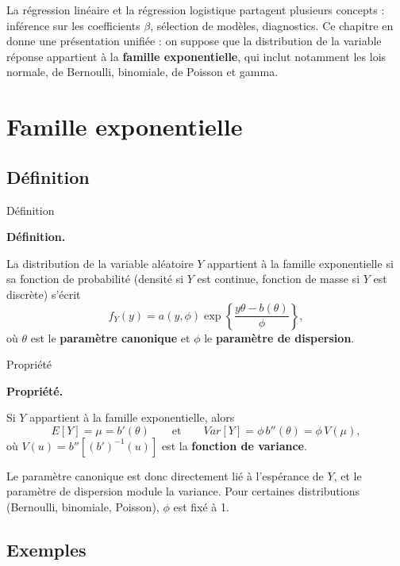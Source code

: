 \documentclass[
  french,
  letterpaper,
  DIV=11,
  numbers=noendperiod]{scrreprt}
\begin{document}
La régression linéaire et la régression logistique partagent plusieurs
concepts : inférence sur les coefficients \(\beta\), sélection de
modèles, diagnostics. Ce chapitre en donne une présentation unifiée : on
suppose que la distribution de la variable réponse appartient à la
\textbf{famille exponentielle}, qui inclut notamment les lois normale,
de Bernoulli, binomiale, de Poisson et gamma.

\section{Famille exponentielle}\label{famille-exponentielle}

\subsection{Définition}\label{duxe9finition}

{Définition}

\textbf{Définition.}

La distribution de la variable aléatoire \(Y\) appartient à la famille
exponentielle si sa fonction de probabilité (densité si \(Y\) est
continue, fonction de masse si \(Y\) est discrète) s'écrit
\[f_Y(y) = a(y,\phi)\exp\left\{\frac{y\theta - b(\theta)}{\phi}\right\},\]
où \(\theta\) est le \textbf{paramètre canonique} et \(\phi\) le
\textbf{paramètre de dispersion}.

\protect{}\label{sec-famexp}
{Propriété}

\textbf{Propriété.}

Si \(Y\) appartient à la famille exponentielle, alors
\[E[Y] = \mu = b'(\theta) \qquad \mbox{et} \qquad Var[Y] = \phi\, b''(\theta) = \phi\, V(\mu),\]
où \(V(u) = b''\!\left[(b')^{-1}(u)\right]\) est la \textbf{fonction de
variance}.

Le paramètre canonique est donc directement lié à l'espérance de \(Y\),
et le paramètre de dispersion module la variance. Pour certaines
distributions (Bernoulli, binomiale, Poisson), \(\phi\) est fixé à 1.

\subsection{Exemples}\label{exemples}
\end{document}

